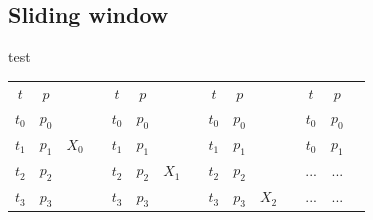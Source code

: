 \documentclass
[twocolumn,
secnumarabic,
nobibnotes,
aps,
prl,
reprint,
groupedaddress,
amsmath,
amssymb,
]{revtex4-2}
\begin{document}
\subsection{Sliding window}
test
\begin{center}%
  \begin{tabular}{|c|c|cc|c|c|cc|c|c|cc|c|c|c}
  \cline{1-2} \cline{5-6} \cline{9-10} \cline{13-14}
  \textbf{$t$} & \textbf{$p$}                  &                &  & \textbf{$t$}                  & \textbf{$p$}                  &                &  & \textbf{$t$}                  & \textbf{$p$}                  &                &  & \textbf{$t$}                  & \textbf{$p$}                      &                  \\ \cline{1-2} \cline{5-6} \cline{9-10} \cline{13-14}
  $t_0$        & \cellcolor[HTML]{C0C0C0}$p_0$ &                &  & \cellcolor[HTML]{FFFFFF}$t_0$ & \cellcolor[HTML]{FFFFFF}$p_0$ &                &  & \cellcolor[HTML]{FFFFFF}$t_0$ & \cellcolor[HTML]{FFFFFF}$p_0$ &                &  & \cellcolor[HTML]{FFFFFF}$t_0$ & \cellcolor[HTML]{FFFFFF}$p_0$     &                  \\ \cline{1-2} \cline{5-6} \cline{9-10} \cline{13-14}
  $t_1$        & \cellcolor[HTML]{C0C0C0}$p_1$ & \textbf{$X_0$} &  & $t_1$                         & \cellcolor[HTML]{C0C0C0}$p_1$ &                &  & \cellcolor[HTML]{FFFFFF}$t_1$ & \cellcolor[HTML]{FFFFFF}$p_1$ &                &  & \cellcolor[HTML]{FFFFFF}$t_0$ & \cellcolor[HTML]{FFFFFF}$p_1$     &                  \\ \cline{1-2} \cline{5-6} \cline{9-10} \cline{13-14}
  $t_2$        & \cellcolor[HTML]{C0C0C0}$p_2$ &                &  & $t_2$                         & \cellcolor[HTML]{C0C0C0}$p_2$ & \textbf{$X_1$} &  & $t_2$                         & \cellcolor[HTML]{C0C0C0}$p_2$ & \textbf{}      &  & \cellcolor[HTML]{FFFFFF}...   & \cellcolor[HTML]{FFFFFF}...       &                  \\ \cline{1-2} \cline{5-6} \cline{9-10} \cline{13-14}
  $t_3$        & \cellcolor[HTML]{C0C0C0}$p_3$ &                &  & $t_3$                         & \cellcolor[HTML]{C0C0C0}$p_3$ &                &  & $t_3$                         & \cellcolor[HTML]{C0C0C0}$p_3$ & \textbf{$X_2$} &  & \cellcolor[HTML]{FFFFFF}...   & \cellcolor[HTML]{FFFFFF}...       &                  \\ \cline{1-2} \cline{5-6} \cline{9-10} \cline{13-14}

\end{tabular}
\end{center}
\end{document}
